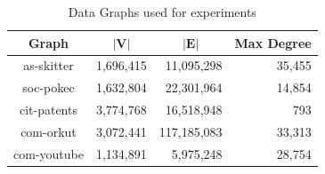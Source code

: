 {\begin{table}[tbp]
    \centering
    \begin{tabular}{@{}crrr@{}}
        \hline
        \multicolumn{1}{c}{\textbf{Graph}} & \multicolumn{1}{c}{$|\textbf{V}|$} & \multicolumn{1}{c}{$|\textbf{E}|$} & \multicolumn{1}{c}{\textbf{Max Degree}} \\ \hline
        as-skitter                         & 1,696,415                          & 11,095,298                         & 35,455                                  \\
        soc-pokec                          & 1,632,804                          & 22,301,964                         & 14,854                                  \\
        cit-patents                        & 3,774,768                          & 16,518,948                         & 793                                     \\
        com-orkut                          & 3,072,441                          & 117,185,083                        & 33,313                                  \\
        com-youtube                        & 1,134,891                          & 5,975,248                          & 28,754                                  \\
        \hline
    \end{tabular}%
    \caption{Data Graphs used for experiments}
    \label{tab:graphs}
\end{table}

}
